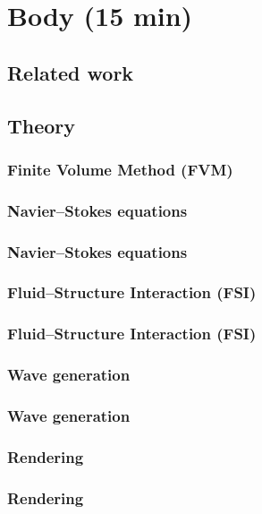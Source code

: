 
\section{Body (15 min)}

\subsection{Related work}



\subsection{Theory}

\subsubsection{Finite Volume Method (FVM)}


\subsubsection{Navier--Stokes equations}
\begin{frame}
\frametitle{Navier--Stokes equations}
\end{frame}





\subsubsection{Fluid--Structure Interaction (FSI)}
\begin{frame}
\frametitle{Fluid--Structure Interaction (FSI)}
\end{frame}

\subsubsection{Wave generation}
\begin{frame}
\frametitle{Wave generation}
\end{frame}

\subsubsection{Rendering}
\begin{frame}
\frametitle{Rendering}
\end{frame}



